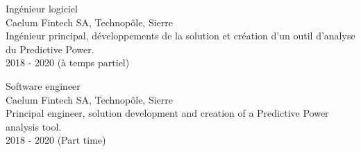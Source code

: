 \ifFrench

  \color{deepgray}
  \large Ingénieur logiciel \\
  \color{mediumgray} \small
  Caelum Fintech SA, Technopôle, Sierre \\
  Ingénieur principal, développements de la solution et création d'un outil d'analyse du Predictive Power. \\
  2018 - 2020 (à temps partiel)
  \commonvspace
\else

  \color{deepgray}
  \large Software engineer \\
  \color{mediumgray} \small
  Caelum Fintech SA, Technopôle, Sierre \\
  Principal engineer, solution development and creation of a Predictive Power analysis tool. \\
  2018 - 2020 (Part time)
  \commonvspace
\fi